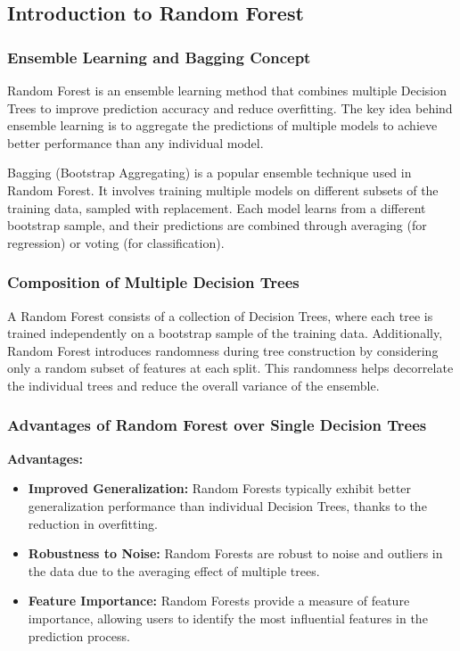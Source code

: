 \documentclass{ufazreport}
\begin{document}
\subsection{Introduction to Random Forest}

\subsubsection{Ensemble Learning and Bagging Concept}

Random Forest is an ensemble learning method that combines multiple Decision Trees to improve prediction accuracy and reduce overfitting. The key idea behind ensemble learning is to aggregate the predictions of multiple models to achieve better performance than any individual model.

Bagging (Bootstrap Aggregating) is a popular ensemble technique used in Random Forest. It involves training multiple models on different subsets of the training data, sampled with replacement. Each model learns from a different bootstrap sample, and their predictions are combined through averaging (for regression) or voting (for classification).

\subsubsection{Composition of Multiple Decision Trees}

A Random Forest consists of a collection of Decision Trees, where each tree is trained independently on a bootstrap sample of the training data. Additionally, Random Forest introduces randomness during tree construction by considering only a random subset of features at each split. This randomness helps decorrelate the individual trees and reduce the overall variance of the ensemble.

\subsubsection{Advantages of Random Forest over Single Decision Trees}

\textbf{Advantages:}
\begin{itemize}
    \item \textbf{Improved Generalization:} Random Forests typically exhibit better generalization performance than individual Decision Trees, thanks to the reduction in overfitting.
    \item \textbf{Robustness to Noise:} Random Forests are robust to noise and outliers in the data due to the averaging effect of multiple trees.
    \item \textbf{Feature Importance:} Random Forests provide a measure of feature importance, allowing users to identify the most influential features in the prediction process.
\end{itemize}
\end{document}
